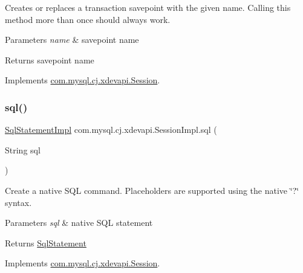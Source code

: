 Creates or replaces a transaction savepoint with the given name. Calling this method more than once should always work.


\begin{DoxyParams}{Parameters}
{\em name} & savepoint name \\
\hline
\end{DoxyParams}
\begin{DoxyReturn}{Returns}
savepoint name 
\end{DoxyReturn}


Implements \mbox{\hyperlink{interfacecom_1_1mysql_1_1cj_1_1xdevapi_1_1_session_a0729993f853b93bd8c819194aaa5f258}{com.\+mysql.\+cj.\+xdevapi.\+Session}}.

\mbox{\label{classcom_1_1mysql_1_1cj_1_1xdevapi_1_1_session_impl_a28b412626c5f92aa146ede32d4e8033d}} 
\subsubsection{\texorpdfstring{sql()}{sql()}}
{\footnotesize\ttfamily \mbox{\hyperlink{classcom_1_1mysql_1_1cj_1_1xdevapi_1_1_sql_statement_impl}{Sql\+Statement\+Impl}} com.\+mysql.\+cj.\+xdevapi.\+Session\+Impl.\+sql (\begin{DoxyParamCaption}\item[{String}]{sql }\end{DoxyParamCaption})}

Create a native S\+QL command. Placeholders are supported using the native \char`\"{}?\char`\"{} syntax.


\begin{DoxyParams}{Parameters}
{\em sql} & native S\+QL statement \\
\hline
\end{DoxyParams}
\begin{DoxyReturn}{Returns}
\mbox{\hyperlink{interfacecom_1_1mysql_1_1cj_1_1xdevapi_1_1_sql_statement}{Sql\+Statement}} 
\end{DoxyReturn}


Implements \mbox{\hyperlink{interfacecom_1_1mysql_1_1cj_1_1xdevapi_1_1_session_a4409e5c0f5917851f9875342b8d38b18}{com.\+mysql.\+cj.\+xdevapi.\+Session}}.


